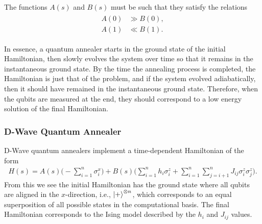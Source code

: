 The functions \( A(s) \) and \( B(s) \) must be such that they satisfy the relations
\begin{align}
\begin{split}
    A(0) &\gg B(0), \\
    A(1) &\ll B(1).
\end{split}
\end{align}

In essence, a quantum annealer starts in the ground state of the initial Hamiltonian, then slowly evolves the system over time so that it remains in the instantaneous ground state.
By the time the annealing process is completed, the Hamiltonian is just that of the problem, and if the system evolved adiabatically, then it should have remained in the instantaneous ground state.
Therefore, when the qubits are measured at the end, they should correspond to a low energy solution of the final Hamiltonian.

\subsubsection{D-Wave Quantum Annealer}
D-Wave quantum annealers implement a time-dependent Hamiltonian of the form~\cite{dwave_qa}
\begin{align}
    H(s) = A(s) \bigg( -\sum_{i=1}^{n} \sigma_i^x \bigg) + B(s) \bigg( \sum_{i=1}^{n} h_i \sigma_i^z + \sum_{i=1}^{n}\sum_{j=i+1}^{n} J_{ij} \sigma_i^z \sigma_j^z \bigg).
\end{align}
From this we see the initial Hamiltonian has the ground state where all qubits are aligned in the \( x \)-direction, i.e., \( \ket{+}^{\otimes n} \), which corresponds to an equal superposition of all possible states in the computational basis.
The final Hamiltonian corresponds to the Ising model described by the \( h_i \) and \( J_{ij} \) values.


